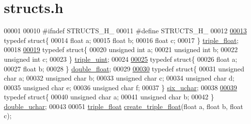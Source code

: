 \hypertarget{structs_8h_source}{}\section{structs.\+h}
\label{structs_8h_source}

\begin{DoxyCode}
00001 
00010 \textcolor{preprocessor}{#ifndef STRUCTS\_H\_}
00011 \textcolor{preprocessor}{#define STRUCTS\_H\_}
00012 
\hypertarget{structs_8h_source.tex_l00013}{}\hyperlink{structtriple__float}{00013} \textcolor{keyword}{typedef} \textcolor{keyword}{struct}\{
00014     \textcolor{keywordtype}{float} a;
00015     \textcolor{keywordtype}{float} b;
00016     \textcolor{keywordtype}{float} c;
00017 \} \hyperlink{structtriple__float}{triple\_float};
00018 
\hypertarget{structs_8h_source.tex_l00019}{}\hyperlink{structtriple__uint}{00019} \textcolor{keyword}{typedef} \textcolor{keyword}{struct}\{
00020     \textcolor{keywordtype}{unsigned} \textcolor{keywordtype}{int} a;
00021     \textcolor{keywordtype}{unsigned} \textcolor{keywordtype}{int} b;
00022     \textcolor{keywordtype}{unsigned} \textcolor{keywordtype}{int} c;
00023 \} \hyperlink{structtriple__uint}{triple\_uint};
00024 
\hypertarget{structs_8h_source.tex_l00025}{}\hyperlink{structdouble__float}{00025} \textcolor{keyword}{typedef} \textcolor{keyword}{struct}\{
00026     \textcolor{keywordtype}{float} a;
00027     \textcolor{keywordtype}{float} b;
00028 \} \hyperlink{structdouble__float}{double\_float};
00029 
\hypertarget{structs_8h_source.tex_l00030}{}\hyperlink{structsix__uchar}{00030} \textcolor{keyword}{typedef} \textcolor{keyword}{struct}\{
00031     \textcolor{keywordtype}{unsigned} \textcolor{keywordtype}{char} a;
00032     \textcolor{keywordtype}{unsigned} \textcolor{keywordtype}{char} b;
00033     \textcolor{keywordtype}{unsigned} \textcolor{keywordtype}{char} c;
00034     \textcolor{keywordtype}{unsigned} \textcolor{keywordtype}{char} d;
00035     \textcolor{keywordtype}{unsigned} \textcolor{keywordtype}{char} e;
00036     \textcolor{keywordtype}{unsigned} \textcolor{keywordtype}{char} f;
00037 \} \hyperlink{structsix__uchar}{six\_uchar};
00038 
\hypertarget{structs_8h_source.tex_l00039}{}\hyperlink{structdouble__uchar}{00039} \textcolor{keyword}{typedef} \textcolor{keyword}{struct}\{
00040     \textcolor{keywordtype}{unsigned} \textcolor{keywordtype}{char} a;
00041     \textcolor{keywordtype}{unsigned} \textcolor{keywordtype}{char} b;
00042 \} \hyperlink{structdouble__uchar}{double\_uchar};
00043 
00051 \hyperlink{structtriple__float}{triple\_float} \hyperlink{structs_8h_a32f52471299d0d08c34e0dc70f2296d6}{create\_triple\_float}(\textcolor{keywordtype}{float} a, \textcolor{keywordtype}{float} b, \textcolor{keywordtype}{float} c);

\end{DoxyCode}
